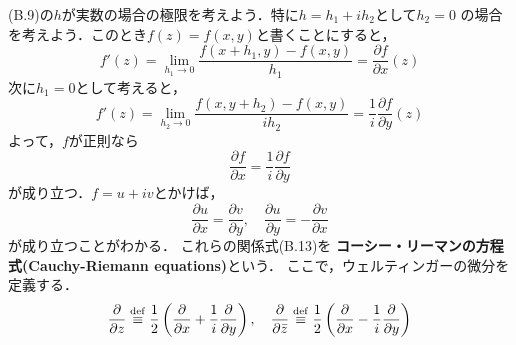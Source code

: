 
\noindent
(B.9)の$h$が実数の場合の極限を考えよう．特に$h = h_{1} + ih_{2}$として$h_{2} = 0$
の場合を考えよう．このとき$f(z) = f(x,y)$と書くことにすると，
\begin{equation}
  f'(z) = \lim_{h_{1} \to 0}\frac{f(x + h_{1},y) - f(x,y)}{h_{1}} = \frac{\partial f}{\partial x}(z)
\end{equation}
次に$h_{1} = 0$として考えると，
\begin{equation}
  f'(z) = \lim_{h_{2} \to 0}\frac{f(x,y + h_{2}) - f(x,y)}{ih_{2}} = \frac{1}{i}\frac{\partial f}{\partial y}(z)
\end{equation}
よって，$f$が正則なら
\begin{equation}
  \frac{\partial f}{\partial x} = \frac{1}{i}\frac{\partial f}{\partial y}
\end{equation}
が成り立つ．$f = u + iv$とかけば，
\begin{equation}
  \frac{\partial u}{\partial x} = \frac{\partial v}{\partial y},\quad \frac{\partial u}{\partial y} = - \frac{\partial v}{\partial x}
\end{equation}
が成り立つことがわかる．
これらの関係式(B.13)を
\textbf{コーシー・リーマンの方程式(Cauchy-Riemann equations)}という．
ここで，ウェルティンガーの微分を定義する．
\begin{equation}
  \frac{\partial}{\partial z}\stackrel{\mathrm{def}}{\equiv} \frac{1}{2}\left( \frac{\partial}{\partial x} + \frac{1}{i}\frac{\partial}{\partial y} \right),\quad \frac{\partial}{\partial \bar{z}} \stackrel{\mathrm{def}}{\equiv} \frac{1}{2}\left( \frac{\partial}{\partial x} - \frac{1}{i}\frac{\partial}{\partial y} \right)
\end{equation}


